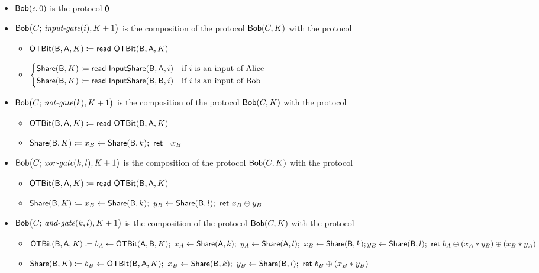 \begin{itemize}
\item $\mathsf{Bob}(\epsilon,0)$ is the protocol $\mathsf{0}$
\item $\mathsf{Bob}\big(C; \, \textit{input-gate}(i),K+1\big)$ is the composition of the protocol $\mathsf{Bob}(C,K)$ with the protocol
\begin{itemize}
\item $\mathsf{OTBit}(\mathsf{B},\mathsf{A},K) \coloneqq \mathsf{read} \ \mathsf{OTBit}(\mathsf{B},\mathsf{A},K)$
\item $\begin{cases*} \Share(\B,K) \coloneqq \read{\InputShare(\B,\A,i)} & \text{if $i$ is an input of Alice} \\ \Share(\B,K) \coloneqq \read{\InputShare(\B,\B,i)} & \text{if $i$ is an input of Bob} \end{cases*}$
\end{itemize}
\item $\mathsf{Bob}\big(C; \, \textit{not-gate}(k),K+1\big)$ is the composition of the protocol $\mathsf{Bob}(C,K)$ with the protocol
\begin{itemize}
\item $\mathsf{OTBit}(\mathsf{B},\mathsf{A},K) \coloneqq \mathsf{read} \ \mathsf{OTBit}(\mathsf{B},\mathsf{A},K)$
\item $\mathsf{Share}(\mathsf{B},K) \coloneqq x_B \leftarrow \mathsf{Share}(\mathsf{B},k); \ \mathsf{ret} \ \neg x_B$
\end{itemize}
\item $\mathsf{Bob}\big(C; \, \textit{xor-gate}(k,l),K+1\big)$ is the composition of the protocol $\mathsf{Bob}(C,K)$ with the protocol
\begin{itemize}
\item $\mathsf{OTBit}(\mathsf{B},\mathsf{A},K) \coloneqq \mathsf{read} \ \mathsf{OTBit}(\mathsf{B},\mathsf{A},K)$
\item $\mathsf{Share}(\mathsf{B},K) \coloneqq x_B \leftarrow \mathsf{Share}(\mathsf{B},k); \ y_B \leftarrow \mathsf{Share}(\mathsf{B},l); \ \mathsf{ret} \ x_B \oplus y_B$
\end{itemize}
\item $\mathsf{Bob}\big(C; \, \textit{and-gate}(k,l),K+1\big)$ is the composition of the protocol $\mathsf{Bob}(C,K)$ with the protocol
\begin{itemize}
\item $\mathsf{OTBit}(\mathsf{B},\mathsf{A},K) \coloneqq b_A \leftarrow \mathsf{OTBit}(\mathsf{A},\mathsf{B},K); \ x_A \leftarrow \mathsf{Share}(\mathsf{A},k); \ y_A \leftarrow \mathsf{Share}(\mathsf{A},l); \ x_B \leftarrow \mathsf{Share}(\mathsf{B},k); \\ y_B \leftarrow \mathsf{Share}(\mathsf{B},l); \ \mathsf{ret} \ b_A \oplus (x_A * y_B) \oplus (x_B * y_A)$
\item $\mathsf{Share}(\mathsf{B},K) \coloneqq b_B \leftarrow \mathsf{OTBit}(\mathsf{B},\mathsf{A},K); \ x_B \leftarrow \mathsf{Share}(\mathsf{B},k); \ y_B \leftarrow \mathsf{Share}(\mathsf{B},l); \ \mathsf{ret} \ b_B \oplus (x_B * y_B)$
\end{itemize}
\end{itemize}


